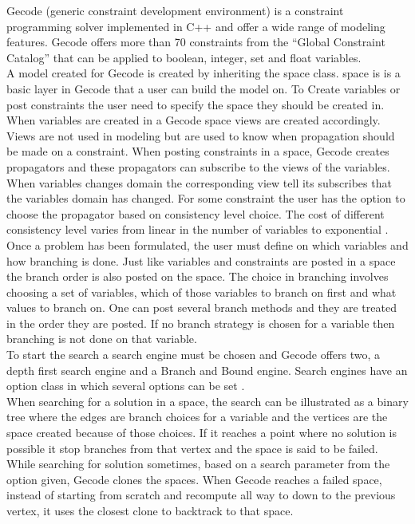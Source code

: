 Gecode (generic constraint development environment) is a constraint programming solver implemented in C++ and 
offer a wide range of modeling features. Gecode offers more than 70 constraints from the ``Global Constraint Catalog'' 
\cite{url_globalCons} that can be applied to boolean, integer, set and float variables.  \\ 
A model created for Gecode is created by inheriting the space class. space is is a basic layer in Gecode that a user 
can build the model on. To Create variables or post constraints the user need to specify the space they should be 
created in. When variables are created in a Gecode space views are created accordingly. Views are not used in modeling 
but are used to know when propagation should be made on a constraint.  When posting constraints in a space, Gecode 
creates propagators and these propagators can subscribe to the views of the variables. When variables changes domain 
the corresponding view tell its subscribes that the variables domain has changed. For some constraint the 
user has the option to choose the propagator based on consistency level choice. The cost of different consistency level 
varies from linear in the number of variables to exponential \cite[p.57]{MPG:M}. \\
Once a problem has been formulated, the user must define on which variables and how branching is done. Just like 
variables and constraints are posted in a space the branch order is also posted on the space. The choice in branching 
involves choosing a set of variables, which of those variables to branch on first and what values to branch on. One can 
post several branch methods and they are treated in the order they are posted. If no branch strategy is chosen for a 
variable then branching is not done on that variable. \\ 
To start the search a search engine must be chosen and Gecode offers two, a depth first search engine and a Branch and 
Bound engine. Search engines have an option class in which several options can be set \cite[p.157]{MPG:M}. \\ 
When searching for a solution in a space, the search can be illustrated as a binary tree where the edges are 
branch choices for a variable and the vertices are the space created because of those choices. If it reaches a point 
where no solution is possible it stop branches from that vertex and the space is said to be failed. While searching for 
solution sometimes, based on a search parameter from the option given, Gecode clones the spaces. When Gecode 
reaches a failed space, instead of starting from scratch and recompute all way to down to the previous vertex, it 
uses the closest clone to backtrack to that space. \\